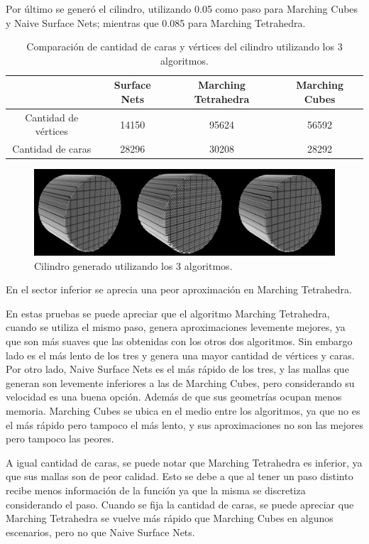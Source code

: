 \documentclass[12pt]{article}
\begin{document}
Por último se generó el cilindro, utilizando 0.05 como paso para Marching Cubes y Naive Surface Nets; mientras que 0.085 para Marching Tetrahedra.
\begin{table}[h!]
  \centering
  \label{tab:table1}
  \begin{tabular}{cccc}
    \toprule
    & Surface Nets & Marching Tetrahedra & Marching Cubes\\
    \midrule
    Cantidad de vértices & 14150 &  95624 & 56592 \\
    Cantidad de caras &  28296 & 30208 & 28292 \\
    \bottomrule
  \end{tabular}
  \caption{Comparación de cantidad de caras y vértices del cilindro utilizando los 3 algoritmos.}
\end{table}
\begin{figure}[h!]
\includegraphics[width=\linewidth,center]{cilindro2.png}
\caption{Cilindro generado utilizando los 3 algoritmos.}
\end{figure}

En el sector inferior se aprecia una peor aproximación en Marching Tetrahedra.

En estas pruebas se puede apreciar que el algoritmo Marching Tetrahedra, cuando se utiliza el mismo paso, genera aproximaciones levemente mejores, ya que son más suaves que las obtenidas con los otros dos algoritmos. Sin embargo lado es el más lento de los tres y genera una mayor cantidad de vértices y caras. Por otro lado, Naive Surface Nets es el más rápido de los tres, y las mallas que generan son levemente inferiores a las de Marching Cubes, pero considerando su velocidad es una buena opción. Además de que sus geometrías ocupan menos memoria. Marching Cubes se ubica en el medio entre los algoritmos, ya que no es el más rápido pero tampoco el más lento, y sus aproximaciones no son las mejores pero tampoco las peores.

A igual cantidad de caras, se puede notar que Marching Tetrahedra es inferior, ya que sus mallas son de peor calidad. Esto se debe a que al tener un paso distinto recibe menos información de la función ya que la misma se discretiza considerando el paso. Cuando se fija la cantidad de caras, se puede apreciar que Marching Tetrahedra se vuelve más rápido que Marching Cubes en algunos escenarios, pero no que Naive Surface Nets.
\end{document}
